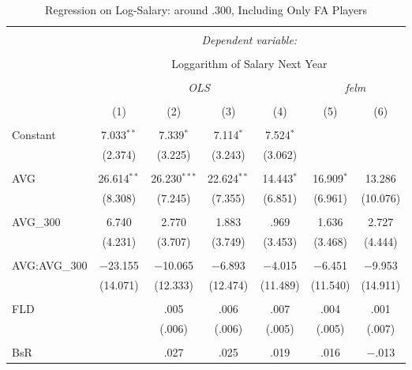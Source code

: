 
\begin{table}[H] \centering
  \caption{Regression on Log-Salary: around .300, Including Only FA Players}
  \label{AVG300_F}
\fontsize{5pt}{4pt}\selectfont
\begin{tabular}{@{\extracolsep{-15pt}}lcccccc}
\\[-1.8ex]\hline
\hline \\[-1.8ex]
 & \multicolumn{6}{c}{\textit{Dependent variable:}} \\
\cline{2-7}
\\[-1.8ex] & \multicolumn{6}{c}{Loggarithm of Salary Next Year} \\
\\[-1.8ex] & \multicolumn{4}{c}{\textit{OLS}} & \multicolumn{2}{c}{\textit{felm}} \\
\\[-1.8ex] & (1) & (2) & (3) & (4) & (5) & (6)\\
\hline \\[-1.8ex]
 Constant & 7.033$^{**}$ & 7.339$^{*}$ & 7.114$^{*}$ & 7.524$^{*}$ &  &  \\
  & (2.374) & (3.225) & (3.243) & (3.062) &  &  \\
  & & & & & & \\
 AVG & 26.614$^{**}$ & 26.230$^{***}$ & 22.624$^{**}$ & 14.443$^{*}$ & 16.909$^{*}$ & 13.286 \\
  & (8.308) & (7.245) & (7.355) & (6.851) & (6.961) & (10.076) \\
  & & & & & & \\
 AVG\_300 & 6.740 & 2.770 & 1.883 & .969 & 1.636 & 2.727 \\
  & (4.231) & (3.707) & (3.749) & (3.453) & (3.468) & (4.444) \\
  & & & & & & \\
  AVG:AVG\_300 & $-$23.155 & $-$10.065 & $-$6.893 & $-$4.015 & $-$6.451 & $-$9.953 \\
  & (14.071) & (12.333) & (12.474) & (11.489) & (11.540) & (14.911) \\
  & & & & & & \\
 FLD &  & .005 & .006 & .007 & .004 & .001 \\
  &  & (.006) & (.006) & (.005) & (.005) & (.007) \\
  & & & & & & \\
 BsR &  & .027 & .025 & .019 & .016 & $-$.013 \\

\end{tabular}
\end{table}
